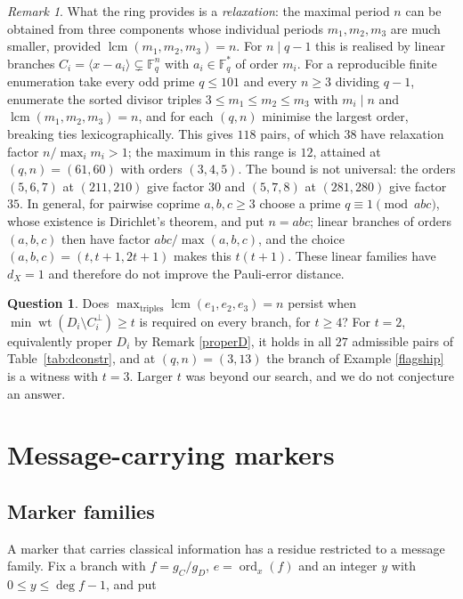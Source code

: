 \documentclass[11pt,reqno]{amsart}
\theoremstyle{definition}
\newtheorem{question}[theorem]{Question}
\theoremstyle{remark}
\newtheorem{remark}[theorem]{Remark}
\newcommand{\F}{\mathbb{F}}
\newcommand{\wt}{\operatorname{wt}}
\newcommand{\ord}{\operatorname{ord}}
\newcommand{\lcm}{\operatorname{lcm}}
\newcommand{\gen}[1]{\langle #1\rangle}
\begin{document}
\begin{remark}\label{relax}
What the ring provides is a \emph{relaxation}: the maximal period $n$ can be obtained from three components whose individual periods $m_1,m_2,m_3$ are much smaller, provided $\lcm(m_1,m_2,m_3)=n$. For $n\mid q-1$ this is realised by linear branches $C_i=\gen{x-a_i}\subsetneq\F_q^n$ with $a_i\in\F_q^*$ of order $m_i$. For a reproducible finite enumeration take every odd prime $q\le101$ and every $n\ge3$ dividing $q-1$, enumerate the sorted divisor triples $3\le m_1\le m_2\le m_3$ with $m_i\mid n$ and $\lcm(m_1,m_2,m_3)=n$, and for each $(q,n)$ minimise the largest order, breaking ties lexicographically. This gives $118$ pairs, of which $38$ have relaxation factor $n/\max_im_i>1$; the maximum in this range is $12$, attained at $(q,n)=(61,60)$ with orders $(3,4,5)$. The bound is not universal: the orders $(5,6,7)$ at $(211,210)$ give factor $30$ and $(5,7,8)$ at $(281,280)$ give factor $35$. In general, for pairwise coprime $a,b,c\ge3$ choose a prime $q\equiv1\pmod{abc}$, whose existence is Dirichlet's theorem, and put $n=a b c$; linear branches of orders $(a,b,c)$ then have factor $a b c/\max(a,b,c)$, and the choice $(a,b,c)=(t,t+1,2t+1)$ makes this $t(t+1)$. These linear families have $d_X=1$ and therefore do not improve the Pauli-error distance.
\end{remark}

\begin{question}\label{distance}
Does $\max_{\text{triples}}\lcm(e_1,e_2,e_3)=n$ persist when $\min\wt(D_i\setminus C_i^\perp)\ge t$ is required on every branch, for $t\ge4$? For $t=2$, equivalently proper $D_i$ by Remark \ref{properD}, it holds in all $27$ admissible pairs of Table~\ref{tab:dconstr}, and at $(q,n)=(3,13)$ the branch of Example \ref{flagship} is a witness with $t=3$. Larger $t$ was beyond our search, and we do not conjecture an answer.
\end{question}

\section{Message-carrying markers}\label{sec:message-carrying-markers}

\subsection{Marker families}

A marker that carries classical information has a residue restricted to a message family. Fix a branch with $f=g_C/g_D$, $e=\ord_x(f)$ and an integer $y$ with $0\le y\le\deg f-1$, and put
\end{document}
